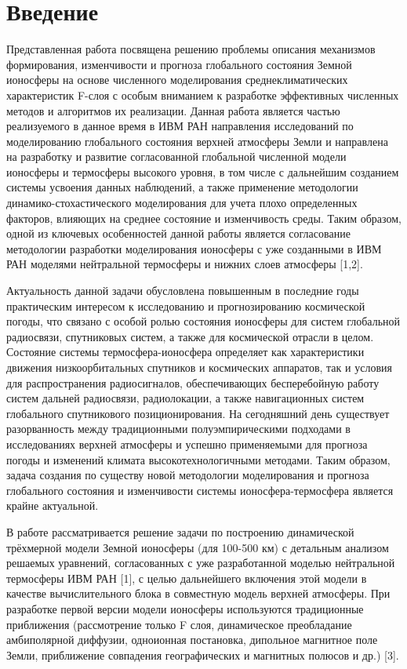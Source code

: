 \documentclass[14pt, a4paper, fleqn]{extarticle}
\begin{document}
\tableofcontents
\clearpage

\section{Введение}
Представленная работа посвящена решению проблемы описания механизмов формирования, изменчивости и прогноза глобального состояния Земной ионосферы на основе численного моделирования среднеклиматических характеристик F-слоя с особым вниманием к разработке эффективных численных методов и алгоритмов их реализации. Данная работа является частью реализуемого в данное время в ИВМ РАН направления исследований по моделированию глобального состояния верхней атмосферы Земли и направлена на разработку и развитие согласованной глобальной численной модели ионосферы и термосферы высокого уровня, в том числе с дальнейшим созданием системы усвоения данных наблюдений, а также применение методологии динамико-стохастического моделирования для учета плохо определенных факторов, влияющих на среднее состояние и изменчивость среды. Таким образом, одной из ключевых особенностей данной работы является согласование методологии разработки моделирования ионосферы с уже созданными в ИВМ РАН моделями нейтральной термосферы и нижних слоев атмосферы [1,2].

Актуальность данной задачи обусловлена повышенным в последние годы практическим интересом к исследованию и прогнозированию космической погоды, что связано с особой ролью состояния ионосферы для систем глобальной радиосвязи, спутниковых систем, а также для космической отрасли в целом. Состояние системы термосфера-ионосфера определяет как характеристики движения низкоорбитальных спутников и космических аппаратов, так и условия для распространения радиосигналов, обеспечивающих бесперебойную работу систем дальней радиосвязи, радиолокации, а также навигационных систем глобального спутникового позиционирования. На сегодняшний день существует разорванность между традиционными полуэмпирическими подходами в исследованиях верхней атмосферы и успешно применяемыми для прогноза погоды и изменений климата высокотехнологичными методами. Таким образом, задача создания по существу новой методологии моделирования и прогноза глобального состояния и изменчивости системы ионосфера-термосфера является крайне актуальной.

В работе рассматривается решение задачи по построению динамической трёхмерной модели Земной ионосферы (для 100-500 км) с детальным анализом решаемых уравнений, согласованных с уже разработанной моделью нейтральной термосферы ИВМ РАН [1], с  целью дальнейшего включения этой модели в качестве вычислительного блока в совместную модель верхней атмосферы. При разработке первой версии модели ионосферы используются традиционные приближения (рассмотрение только F слоя, динамическое преобладание амбиполярной диффузии, одноионная постановка, дипольное магнитное поле Земли, приближение совпадения географических и магнитных полюсов и др.) [3]. 
\end{document}
